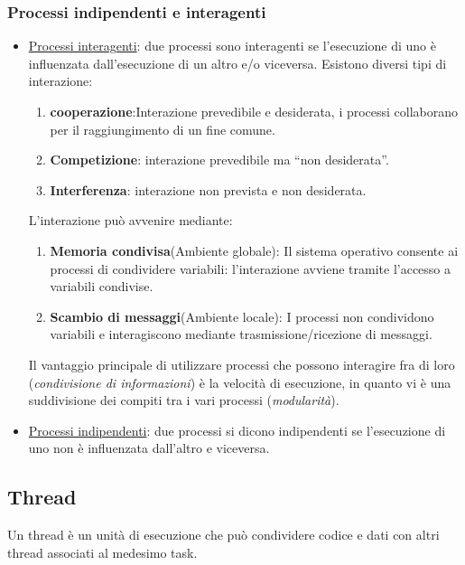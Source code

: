 \documentclass{article}
\begin{document}
\subsubsection{Processi indipendenti e interagenti}
\begin{itemize}
    \item \underline{Processi interagenti}: due processi 
    sono interagenti se l'esecuzione di uno è influenzata
    dall'esecuzione di un altro e/o viceversa. Esistono diversi
    tipi di interazione: \begin{enumerate}
        \item \textbf{cooperazione}:Interazione prevedibile e
        desiderata, i processi collaborano per il 
        raggiungimento di un fine comune.
        \item \textbf{Competizione}: interazione prevedibile
        ma “non desiderata”.
        \item \textbf{Interferenza}: interazione non prevista
         e non desiderata. 
    \end{enumerate}
    L'interazione può avvenire mediante:
    \begin{enumerate}
        \item \textbf{Memoria condivisa}(Ambiente globale):
        Il sistema operativo consente ai processi di condividere variabili: 
        l'interazione avviene tramite l'accesso a variabili
        condivise.
        \item \textbf{Scambio di messaggi}(Ambiente locale): 
        I processi non condividono variabili e interagiscono mediante
        trasmissione/ricezione di messaggi.
    \end{enumerate}
    Il vantaggio principale di utilizzare processi che possono
    interagire fra di loro (\textit{condivisione di informazioni})
    è la velocità di esecuzione, in quanto vi è una
    suddivisione dei compiti tra i vari processi (\textit{modularità}).
    
    \item \underline{Processi indipendenti}: due processi si dicono 
    indipendenti se l'esecuzione di uno non è influenzata dall'altro e viceversa.
\end{itemize}

\subsection{Thread}
Un thread è un unità di esecuzione che può condividere codice e dati con altri
thread associati al medesimo task.
\medskip
\end{document}
